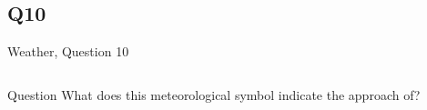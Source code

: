 \documentclass[11pt]{beamer}
\begin{document}
\subsection*{Q10}
\begin{frame}[t]{Weather, Question 10}
\begin{columns}[T,totalwidth=\linewidth]
\begin{column}{0.32\linewidth}
\begin{block}{Question}
What does this meteorological symbol indicate the approach of?
\end{block}
\end{column}
\begin{column}{0.65\linewidth}
\begin{center}
\texttt{[image: \{Images/coldfront]}.png}
\end{center}
\end{column}
\end{columns}
\end{frame}
\end{document}
